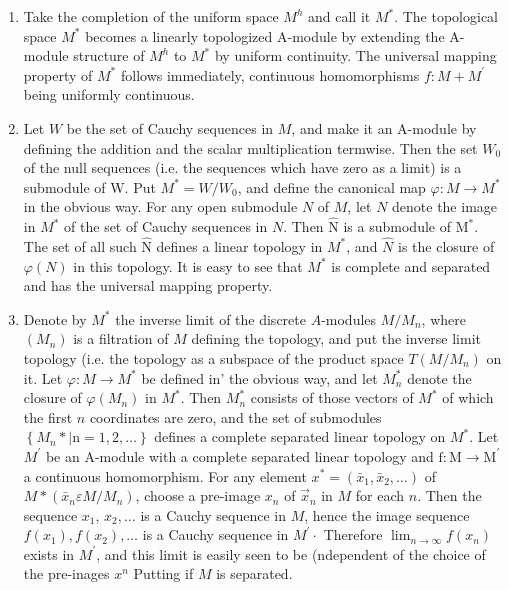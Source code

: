 \begin{enumerate}
  \item Take the completion of the uniform space $M^{h}$ and call it $M^{*}$. The topological space $M^{*}$ becomes a linearly topologized A-module by extending the A-module structure of $M^{h}$ to $M^{*}$ by uniform continuity. The universal mapping property of $M^{*}$ follows immediately, continuous homomorphisms $f: M+M^{\prime}$ being uniformly continuous.

  \item Let $W$ be the set of Cauchy sequences in $M$, and make it an A-module by defining the addition and the scalar multiplication termwise. Then the set $W_{0}$ of the null sequences (i.e. the sequences which have zero as a limit) is a submodule of W. Put $M^{*}=W / W_{0}$, and define the canonical map $\varphi: M \rightarrow M^{*}$ in the obvious way. For any open submodule $N$ of $M$, let $N$ denote the image in $M^{*}$ of the set of Cauchy sequences in $N$. Then $\hat{\mathrm{N}}$ is a submodule of $\mathrm{M}^{*}$. The set of all such $\hat{\mathrm{N}}$ defines a linear topology in $M^{*}$, and $\hat{N}$ is the closure of $\varphi(N)$ in this topology. It is easy to see that $M^{*}$ is complete and separated and has the universal mapping property.

  \item Denote by $M^{*}$ the inverse limit of the discrete $A$-modules $M / M_{n}$, where $\left(M_{n}\right)$ is a filtration of $M$ defining the topology, and put the inverse limit topology (i.e. the topology as a subspace of the product space $T\left(M / M_{n}\right)$ on it. Let $\varphi: M \rightarrow M^{*}$ be defined in' the obvious way, and let $M_{n}^{*}$ denote the closure of $\varphi\left(M_{n}\right)$ in $M^{*}$. Then $M_{n}^{*}$ consists of those vectors of $M^{*}$ of which the first $n$ coordinates are zero, and the set of submodules $\left\{M_{n} * \mid \mathrm{n}=1,2, \ldots\right\}$ defines a complete separated linear topology on $M^{*}$. Let $M^{\prime}$ be an A-module with a complete separated linear topology and $\mathrm{f}: \mathrm{M} \rightarrow \mathrm{M}^{\prime}$ a continuous homomorphism. For any element $x^{*}=\left(\bar{x}_{1}, \bar{x}_{2}, \ldots\right)$ of $M *\left(\bar{x}_{n} \varepsilon M / M_{n}\right)$, choose a pre-image $x_{n}$ of $\vec{x}_{n}$ in $M$ for each $n$. Then the sequence $x_{1}$, $x_{2}, \ldots$ is a Cauchy sequence in $M$, hence the image sequence $f\left(x_{1}\right), f\left(x_{2}\right), \ldots$ is a Cauchy sequence in $M^{\prime} \cdot$ Therefore $\lim _{n \rightarrow \infty} f\left(x_{n}\right)$ exists in $M^{\prime}$, and this limit is easily seen to be (ndependent of the choice of the pre-inages $x^{n}$ Putting if $M$ is separated.

\end{enumerate}
